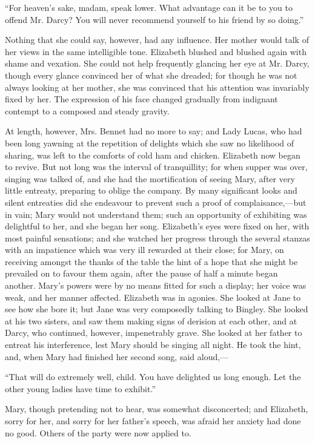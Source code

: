 ``For heaven's sake, madam, speak lower. What advantage can it be to you to offend Mr. Darcy? You will never recommend yourself to his friend by so doing.''

Nothing that she could say, however, had any influence. Her mother would talk of her views in the same intelligible tone. Elizabeth blushed and blushed again with shame and vexation. She could not help frequently glancing her eye at Mr. Darcy, though every glance convinced her of what she dreaded; for though he was not always looking at her mother, she was convinced that his attention was invariably fixed by her. The expression of his face changed gradually from indignant contempt to a composed and steady gravity.

At length, however, Mrs. Bennet had no more to say; and Lady Lucas, who had been long yawning at the repetition of delights which she saw no likelihood of sharing, was left to the comforts of cold ham and chicken. Elizabeth now began to revive. But not long was the interval of tranquillity; for when supper was over, singing was talked of, and she had the mortification of seeing Mary, after very little entreaty, preparing to oblige the company. By many significant looks and silent entreaties did she endeavour to prevent such a proof of complaisance,---but in vain; Mary would not understand them; such an opportunity of exhibiting was delightful to her, and she began her song. Elizabeth's eyes were fixed on her, with most painful sensations; and she watched her progress through the several stanzas with an impatience which was very ill rewarded at their close; for Mary, on receiving amongst the thanks of the table the hint of a hope that she might be prevailed on to favour them again, after the pause of half a minute began another. Mary's powers were by no means fitted for such a display; her voice was weak, and her manner affected. Elizabeth was in agonies. She looked at Jane to see how she bore it; but Jane was very composedly talking to Bingley. She looked at his two sisters, and saw them making signs of derision at each other, and at Darcy, who continued, however, impenetrably grave. She looked at her father to entreat his interference, lest Mary should be singing all night. He took the hint, and, when Mary had finished her second song, said aloud,---

``That will do extremely well, child. You have delighted us long enough. Let the other young ladies have time to exhibit.''

Mary, though pretending not to hear, was somewhat disconcerted; and Elizabeth, sorry for her, and sorry for her father's speech, was afraid her anxiety had done no good. Others of the party were now applied to.

